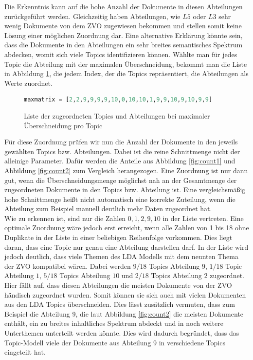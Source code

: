 \documentclass[german,version-2020-11]{uzl-thesis}
\begin{document}
Die Erkenntnis kann auf die hohe Anzahl der Dokumente in diesen Abteilungen zurückgeführt werden. Gleichzeitig haben Abteilungen, wie $L5$ oder $L3$ sehr wenig Dokumente von dem ZVO zugewiesen bekommen und stellen somit keine Lösung einer möglichen Zuordnung dar. Eine alternative Erklärung könnte sein, dass die Dokumente in den Abteilungen ein sehr breites semantisches Spektrum abdecken, womit sich viele Topics identifizieren können. Wählte man für jedes Topic die Abteilung mit der maximalen Überschneidung, bekommt man die Liste in Abbildung \ref{fig:maxlist}, die jedem Index, der die Topics repräsentiert, die Abteilungen als Werte zuordnet.

\begin{figure}[H]
\begin{center}
\begin{lstlisting}[language=Python]
maxmatrix = [2,2,9,9,9,9,10,0,10,10,1,9,9,10,9,10,9,9]
\end{lstlisting}
\caption{Liste der zugeordneten Topics und Abteilungen bei maximaler Überschneidung pro Topic}
\label{fig:maxlist}
\end{center}
\end{figure}


Für diese Zuordnung prüfen wir nun die Anzahl der Dokumente in den jeweils gewählten Topics bzw. Abteilungen. Dabei ist die reine Schnittmenge nicht der alleinige Parameter. Dafür werden die Anteile aus Abbildung \ref{fig:count1} und Abbildung \ref{fig:count2} zum Vergleich herangezogen. Eine Zuordnung ist nur dann gut, wenn die Überschneidungsmenge möglichst nah an der Gesamtmenge der zugeordneten Dokumente in den Topics bzw. Abteilung ist. Eine vergleichsmäßig hohe Schnittmenge heißt nicht automatisch eine korrekte Zuteilung, wenn die Abteilung zum Beispiel manuell deutlich mehr Daten zugeordnet hat.\\


Wie zu erkennen ist, sind nur die Zahlen $ 0,1,2,9,10 $ in der Liste vertreten. Eine optimale Zuordnung wäre jedoch erst erreicht, wenn alle Zahlen von 1 bis 18 ohne Duplikate in der Liste in einer beliebigen Reihenfolge vorkommen. Dies liegt daran, dass eine Topic nur genau eine Abteilung darstellen darf. In der Liste wird jedoch deutlich, dass viele Themen des LDA Modells mit dem neunten Thema der ZVO kompatibel wären. Dabei werden $9/18$ Topics Abteilung $9$, $1/18$ Topic Abteilung $1$, $5/18$ Topics Abteilung $10$ und $2/18$ Topics Abteilung $2$ zugeordnet. Hier fällt auf, dass diesen Abteilungen die meisten Dokumente von der ZVO händisch zugeordnet wurden. Somit können sie sich auch mit vielen Dokumenten aus den LDA Topics überschneiden. Dies lässt zusätzlich vermuten, dass zum Beispiel die Abteilung 9, die laut Abbildung \ref{fig:count2} die meisten Dokumente enthält, ein zu breites inhaltliches Spektrum abdeckt und in noch weitere Unterthemen unterteilt werden könnte. Dies wird dadurch begründet, dass das Topic-Modell viele der Dokumente aus Abteilung 9 in verschiedene Topics eingeteilt hat.\\
\end{document}
